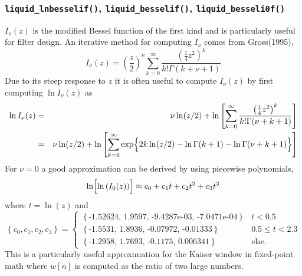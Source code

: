 \subsubsection{{\tt liquid\_lnbesselif()},
               {\tt liquid\_besselif()},
               {\tt liquid\_besseli0f()}}
\label{module:math:transcendentals:besseli}
$I_\nu(z)$ is the modified Bessel function of the first kind and is
particularly useful for filter design.
An iterative method for computing $I_\nu$ comes from Gross(1995),
\begin{equation}
\label{eqn:math:besseli}
    I_\nu(z) =
        \left(\frac{z}{2}\right)^\nu
        \sum_{k=0}^{\infty}{\frac{\left(\frac{1}{4}z^2\right)^k}{k!\Gamma(k+\nu+1)}}
\end{equation}
%
Due to its steep response to $z$ it is often useful to compute
$I_\nu(z)$ by first computing $\ln I_\nu(z)$ as
%
\begin{eqnarray*}
\label{eqn:math:lnbesseli}
    \ln I_\nu(z) & = &
        \nu\ln(z/2) + \ln\left[
            \sum_{k=0}^\infty{
                \frac{
                    \left(\frac{1}{4}z^2\right)^k
                }{
                    k! \Gamma(\nu + k + 1)
                }
            }
        \right] \\
        & = &
        \nu\ln(z/2) + \ln\left[
            \sum_{k=0}^\infty{ \exp\Bigl\{
                2 k \ln(z/2) - \ln\Gamma(k+1) - \ln\Gamma(\nu+k+1)
            \Bigr\} }
        \right] \\
\end{eqnarray*}
%
For $\nu=0$ a good approximation can be derived by
using piecewise polynomials,
%
\begin{equation}
\label{eqn:math:besseli0_approx}
    \ln\Bigl[\ln\left(I_0(z)\right)\Bigr] \approx
    c_0 + c_1 t + c_2 t ^2 + c_3 t^3
\end{equation}
%
where $t=\ln(z)$ and
%
\[
    \left\{c_0,c_1,c_2,c_3\right\} =
    \begin{cases}
    \left\{\text{-1.52624, 1.9597, -9.4287e-03, -7.0471e-04}\right\} & t < 0.5 \\
    \left\{\text{-1.5531, 1.8936, -0.07972, -0.01333}\right\} & 0.5 \le t < 2.3 \\
    \left\{\text{-1.2958, 1.7693, -0.1175, 0.006341}\right\} & \text{else}.
    \end{cases}
\]
This is a particularly useful approximation for the Kaiser window in
fixed-point math where $w[n]$ is computed as the ratio of two large numbers.




